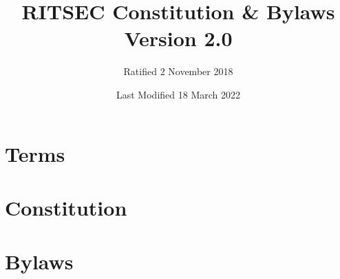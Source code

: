 \documentclass{constitution}
\title{RITSEC Constitution \& Bylaws\\ Version 2.0}
\author{Ratified 2 November 2018}
\date{Last Modified 18 March 2022}
\begin{document}
\maketitle
\newpage

\part{Terms}



\newpage

\part{Constitution}












\newpage


\part{Bylaws}




\end{document}
